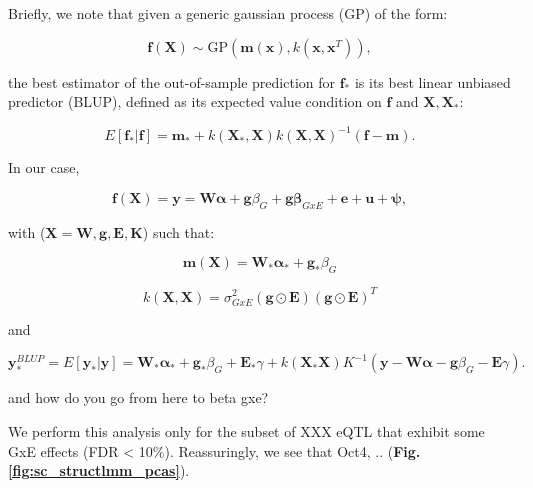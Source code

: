 Briefly, we note that given a generic gaussian process ($\mathrm{GP}$) of the form:
 
\begin{equation}
    \mathbf{f}(\mathbf{X}) \sim \mathrm{GP}(\mathbf{m}(\mathbf{x}), k(\mathbf{x},\mathbf{x}^T)),
\end{equation}

the best estimator of the out-of-sample prediction for $\mathbf{f}_*$  is its best linear unbiased predictor (BLUP), defined as its expected value condition on $\mathbf{f}$ and $\mathbf{X},\mathbf{X}_*$:

\begin{equation}
    E[\mathbf{f}_*|\mathbf{f}] = \mathbf{m}_* +k(\mathbf{X}_*,\mathbf{X})k(\mathbf{X},\mathbf{X})^{-1}(\mathbf{f}-\mathbf{m}).
\end{equation}

In our case,

\begin{equation}
    \mathbf{f}(\mathbf{X}) = \mathbf{y} = \mathbf{W}\boldsymbol{\alpha}+\mathbf{g}\beta_G+\mathbf{g}\boldsymbol{\beta}_{GxE}+\mathbf{e} + \mathbf{u} + \boldsymbol{\psi},
\end{equation}

with ($\mathbf{X} = {\mathbf{W},\mathbf{g},\mathbf{E},\mathbf{K}}$) such that:

\begin{equation}
    \mathbf{m}(\mathbf{X}) = \mathbf{W}_*\boldsymbol{\alpha}_{*}+\mathbf{g}_*\beta_G
\end{equation}

\begin{equation}
    k(\mathbf{X},\mathbf{X}) = \sigma_{GxE}^2(\mathbf{g}\odot\mathbf{E})(\mathbf{g}\odot\mathbf{E})^T
\end{equation}

and 

\begin{equation}
\mathbf{y}_{*}^{BLUP} = E[\mathbf{y}_*|\mathbf{y}] = \mathbf{W}_*\boldsymbol{\alpha}_{*}+\mathbf{g}_*\beta_G+\mathbf{E}_*\gamma + k(\mathbf{X}_*\mathbf{X})K^{-1}(\mathbf{y}-\mathbf{W}\boldsymbol{\alpha}-\mathbf{g}\beta_G-\mathbf{E}\gamma).
\end{equation}

and how do you go from here to beta gxe?

\newpage



We perform this analysis only for the subset of XXX eQTL that exhibit some GxE effects (FDR < 10\%).
Reassuringly, we see that Oct4, .. (\textbf{Fig. \ref{fig:sc_structlmm_pcas}}).\\

